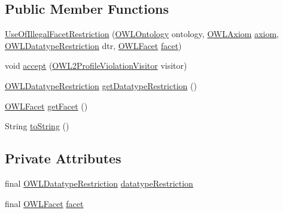 \subsection*{Public Member Functions}
\begin{DoxyCompactItemize}
\item 
\hyperlink{classorg_1_1semanticweb_1_1owlapi_1_1profiles_1_1_use_of_illegal_facet_restriction_a71444bbf826340716423836d044f441e}{Use\-Of\-Illegal\-Facet\-Restriction} (\hyperlink{interfaceorg_1_1semanticweb_1_1owlapi_1_1model_1_1_o_w_l_ontology}{O\-W\-L\-Ontology} ontology, \hyperlink{interfaceorg_1_1semanticweb_1_1owlapi_1_1model_1_1_o_w_l_axiom}{O\-W\-L\-Axiom} \hyperlink{classorg_1_1semanticweb_1_1owlapi_1_1profiles_1_1_o_w_l_profile_violation_aa7c8e8910ed3966f64a2c003fb516214}{axiom}, \hyperlink{interfaceorg_1_1semanticweb_1_1owlapi_1_1model_1_1_o_w_l_datatype_restriction}{O\-W\-L\-Datatype\-Restriction} dtr, \hyperlink{enumorg_1_1semanticweb_1_1owlapi_1_1vocab_1_1_o_w_l_facet}{O\-W\-L\-Facet} \hyperlink{classorg_1_1semanticweb_1_1owlapi_1_1profiles_1_1_use_of_illegal_facet_restriction_a9813498f51983c5596ea178f74de98e2}{facet})
\item 
void \hyperlink{classorg_1_1semanticweb_1_1owlapi_1_1profiles_1_1_use_of_illegal_facet_restriction_a869ecf848fc128e43ede4614af1e9849}{accept} (\hyperlink{interfaceorg_1_1semanticweb_1_1owlapi_1_1profiles_1_1_o_w_l2_profile_violation_visitor}{O\-W\-L2\-Profile\-Violation\-Visitor} visitor)
\item 
\hyperlink{interfaceorg_1_1semanticweb_1_1owlapi_1_1model_1_1_o_w_l_datatype_restriction}{O\-W\-L\-Datatype\-Restriction} \hyperlink{classorg_1_1semanticweb_1_1owlapi_1_1profiles_1_1_use_of_illegal_facet_restriction_a7d3640175accb1a3477aa2551f99b083}{get\-Datatype\-Restriction} ()
\item 
\hyperlink{enumorg_1_1semanticweb_1_1owlapi_1_1vocab_1_1_o_w_l_facet}{O\-W\-L\-Facet} \hyperlink{classorg_1_1semanticweb_1_1owlapi_1_1profiles_1_1_use_of_illegal_facet_restriction_add5c1112984abdb8b59c885528aefe7d}{get\-Facet} ()
\item 
String \hyperlink{classorg_1_1semanticweb_1_1owlapi_1_1profiles_1_1_use_of_illegal_facet_restriction_a25c7f36939cb8e6dee3922f64157c8da}{to\-String} ()
\end{DoxyCompactItemize}
\subsection*{Private Attributes}
\begin{DoxyCompactItemize}
\item 
final \hyperlink{interfaceorg_1_1semanticweb_1_1owlapi_1_1model_1_1_o_w_l_datatype_restriction}{O\-W\-L\-Datatype\-Restriction} \hyperlink{classorg_1_1semanticweb_1_1owlapi_1_1profiles_1_1_use_of_illegal_facet_restriction_a73d0e0d2447892d8e9cb5808e4871e1e}{datatype\-Restriction}
\item 
final \hyperlink{enumorg_1_1semanticweb_1_1owlapi_1_1vocab_1_1_o_w_l_facet}{O\-W\-L\-Facet} \hyperlink{classorg_1_1semanticweb_1_1owlapi_1_1profiles_1_1_use_of_illegal_facet_restriction_a9813498f51983c5596ea178f74de98e2}{facet}
\end{DoxyCompactItemize}


